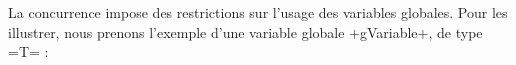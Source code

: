 %
%
%














La concurrence impose des restrictions sur l'usage des variables globales. Pour les illustrer, nous prenons l'exemple d'une variable globale \plm+gVariable+, de type \plm=T= :

